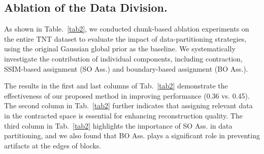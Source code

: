 \subsection{ Ablation of the Data Division.}
\label{sec:data_division}


As shown in Table.~\ref{tab2}, we conducted chunk-based ablation experiments on the entire TNT dataset to evaluate the impact of data-partitioning strategies, using the original Gaussian global prior as the baseline. 
We systematically investigate the contribution of individual components, including contraction, SSIM-based assignment (SO Ass.) and boundary-based assignment (BO Ass.).

The results in the first and last columns of Tab.~\ref{tab2} demonstrate the effectiveness of our proposed method in improving performance (0.36 vs. 0.45). 
The second column in Tab.~\ref{tab2} further indicates that assigning relevant data in the contracted space is essential for enhancing reconstruction quality. 
The third column in Tab.~\ref{tab2} highlights the importance of SO Ass. in data partitioning, and we also found that BO Ass. plays a significant role in preventing artifacts at the edges of blocks.



